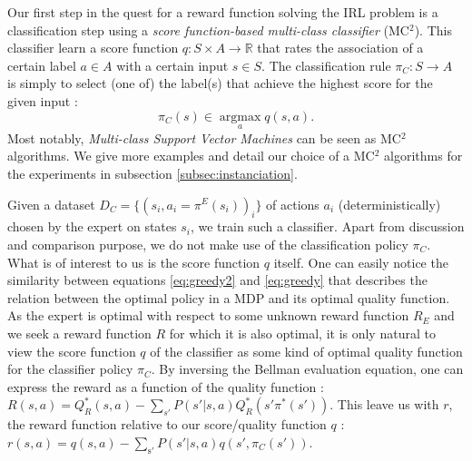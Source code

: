 \documentclass[smallextended]{svjour3}
\newcommand{\argmax}{\operatorname*{argmax}} %
\begin{document}
Our first step in the quest for a reward function solving the IRL problem is a classification step using a \emph{score function-based multi-class classifier} (MC$^2$). This classifier learn a score function $q:S\times A \rightarrow \mathbb{R}$ that rates the association of a certain label $a\in A$ with a certain input $s\in S$. The classification rule $\pi_C: S \rightarrow A$ is simply to select (one of) the label(s) that achieve the highest score for the given input :
\begin{equation}
  \label{eq:greedy2}
\pi_C(s) \in \argmax_a q(s,a).
\end{equation}
Most notably, \emph{Multi-class Support Vector Machines} can be seen as MC$^2$ algorithms. We give more examples and detail our choice of a MC$^2$ algorithms for the experiments in subsection \ref{subsec:instanciation}. 

Given a dataset $D_C = \{(s_i,a_i=\pi^E(s_i))_i\}$ of actions $a_i$ (deterministically) chosen by the expert on states $s_i$, we train such a classifier. Apart from discussion and comparison purpose, we do not make use of the classification policy $\pi_C$. What is of interest to us is the score function $q$ itself. One can easily notice the similarity between equations \ref{eq:greedy2} and \ref{eq:greedy} that describes the relation between the optimal policy in a MDP and its optimal quality function. As the expert is optimal with respect to some unknown reward function $R_E$ and we seek a reward function $R$ for which it is also optimal, it is only natural to view the score function $q$ of the classifier as some kind of optimal quality function for the classifier policy $\pi_C$. By inversing the Bellman evaluation equation, one can express the reward as a function of the quality function : $R(s,a) = Q^*_R(s,a) - \sum_{s'}P(s'|s,a)Q^*_R(s'\pi^*(s'))$. This leave us with $r$, the reward function relative to our score/quality function $q$ : $r(s,a) =q(s,a) - \sum_{\mathrm{s'}}P(s'|s,a)q(s',\pi_C(s'))$.
\end{document}
